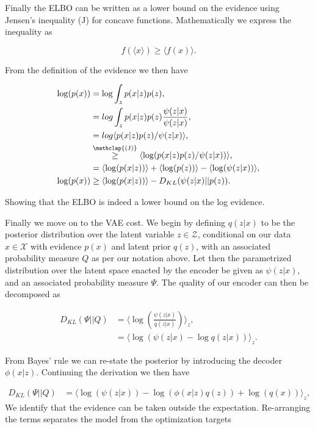\noindent Finally the ELBO can be written as a lower bound on the evidence using Jensen's inequality (J) for concave functions. Mathematically we express the inequality as 

\begin{equation}
f(\langle x\rangle) \geq \langle f(x) \rangle.
\end{equation}

\noindent From the definition of the evidence we then have

\begin{align}
\log (p(x)) &= \log \int_z p(x|z) p(z), \\
&= log \int _z p(x|z) p(z) \frac{\psi(z|x)}{\psi(z|x)},\\
& = log \langle p(x|z) p(z)/ \psi (z|x) \rangle, \\
&  \stackrel{\mathclap{\text{(J)}}}{\geq} \langle \log (p(x|z) p(z)/ \psi(z|x))\rangle,\\
& = \langle \log(p(x|z))\rangle + \langle \log(p(z))\rangle  - \langle \log(\psi (z|x))\rangle, \\
\log (p (x)) &\geq \langle \log(p(x|z))\rangle - D_{KL}(\psi (z|x) || p(z)).
\end{align}

\noindent Showing that the ELBO is indeed a lower bound on the log evidence. 

Finally we move on to the VAE cost. We begin by defining $q(z|x)$ to be the posterior distribution over the latent variable $z \in \mathcal{Z}$, conditional on our data $x \in \mathcal{X}$ with evidence $p(x)$ and latent prior $q(z)$, with an associated probability measure $Q$ as per our notation above. Let then the parametrized distribution over the latent space enacted by the encoder be given as $\psi(z|x)$, and an associated probability measure $\Psi$. The quality of our encoder can then be decomposed as 

\begin{align}
D_{KL}(\Psi || Q ) &= \langle \log \left(\frac{\psi(z|x)}{q(z|x)}\right) \rangle_z, \\
&= \langle \log \left(\psi(z|x)- \log q(z|x)\right) \rangle_z.
\end{align}

\noindent From Bayes' rule we can re-state the posterior by introducing the decoder $\phi(x|z)$. Continuing the derivation we then have 

\begin{align}
D_{KL}(\Psi || Q ) &=  \langle \log \left( \psi(z|x)\right)  - \log \left( \phi( x | z) q(z) \right) + \log (q(x))\rangle_z, 
\end{align}
\noindent We identify that the evidence can be taken outside the expectation. Re-arranging the terms separates the model from the optimization targets 


